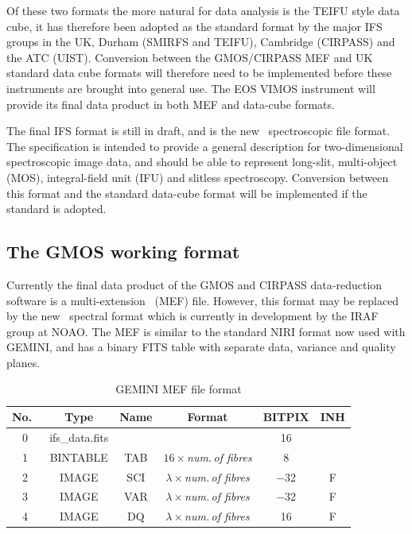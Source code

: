 \documentclass[twoside,11pt]{article}
\newcommand{\htmlref}[2]{#1}
\newcommand{\xlabel}[1]{}
\begin{document}
Of these two formats the more natural for data analysis is the TEIFU
style data cube, it has therefore been adopted as the standard format
by the major IFS groups in the UK, Durham (SMIRFS and TEIFU),
Cambridge (CIRPASS) and the ATC (UIST).
\htmlref{Conversion}{sc16_mef2cub} between the GMOS/CIRPASS MEF and UK
standard data cube formats will therefore need to be implemented
before these instruments are brought into general use.  The EOS VIMOS
instrument will provide its final data product in both MEF and
data-cube formats.

The final IFS format is still in draft, and is the new \IRAF\ 
spectroscopic \htmlref{file format}{sc16_iraf}.  The specification is intended to
provide a general description for two-dimensional spectroscopic image
data, and should be able to represent long-slit, multi-object (MOS),
integral-field unit (IFU) and slitless spectroscopy.  Conversion
between this format and the standard data-cube format will be
implemented if the standard is adopted.

\subsection{\xlabel{sc16_gmosfile}The GMOS working format\label{sc16_gmosfile}}

Currently the final data product of the \htmlref{GMOS}{sc16_gmos} and
\htmlref{CIRPASS}{sc16_cirpass} data-reduction software is a
multi-extension \FITSref\ (MEF) file.  However, this format may be
replaced by the new \htmlref{\IRAF\ spectral
format}{sc16_iraf} which is
currently in development by the IRAF group at NOAO.  The MEF is
similar to the standard NIRI format now used with GEMINI, and has a
binary FITS table with separate data, variance and quality planes.

\begin{table}[h]
\begin{center}
\begin{tabular}{cccccc}
No.\ & Type  & Name & Format & BITPIX & INH\\\hline 
0  & ifs\_data.fits &  &                                     &  16 &   \\
1  & BINTABLE  & TAB & $16 \times${\em num.\,of fibres}      &   8 &   \\    
2  & IMAGE     & SCI & $\lambda \times${\em num.\,of fibres} & $-$32 & F \\
3  & IMAGE     & VAR & $\lambda \times${\em num.\,of fibres} & $-$32 & F \\
4  & IMAGE     & DQ  & $\lambda \times${\em num.\,of fibres} &  16 & F \\ \hline
\end{tabular}
\caption{GEMINI MEF file format}
\end{center}
\protect\label{tab:mef_file}
\end{table} 
\end{document}
